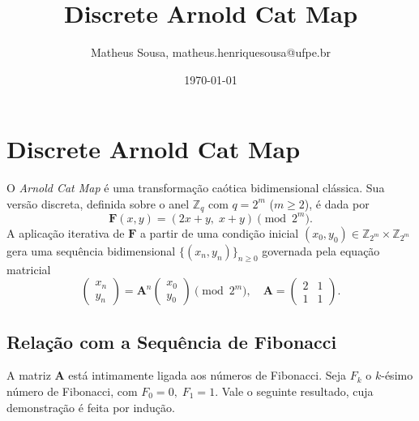 \documentclass[12pt,a4paper]{article}
\title{Discrete Arnold Cat Map}
\author{Matheus Sousa, matheus.henriquesousa@ufpe.br}
\date{\today}
\begin{document}
\maketitle

\section{Discrete Arnold Cat Map}
O \textit{Arnold Cat Map} é uma transformação caótica bidimensional clássica. Sua versão discreta, definida sobre o anel \(\mathbb{Z}_{q}\) com \(q=2^m\) (\(m\ge 2\)), é dada por
\begin{equation}\label{eq:dacm}
\mathbf{F}(x,y) = (2x + y,\; x + y) \pmod{2^m}.
\end{equation}
A aplicação iterativa de \(\mathbf{F}\) a partir de uma condição inicial \((x_0,y_0)\in \mathbb{Z}_{2^m}\times\mathbb{Z}_{2^m}\) gera uma sequência bidimensional \(\{(x_n,y_n)\}_{n\ge 0}\) governada pela equação matricial
\begin{equation}\label{eq:matriz}
\begin{pmatrix} x_n \\ y_n \end{pmatrix}
= \mathbf{A}^n \begin{pmatrix} x_0 \\ y_0 \end{pmatrix} \pmod{2^m},
\quad \mathbf{A} = \begin{pmatrix} 2 & 1 \\ 1 & 1 \end{pmatrix}.
\end{equation}

\subsection{Relação com a Sequência de Fibonacci}
A matriz \(\mathbf{A}\) está intimamente ligada aos números de Fibonacci. Seja \(F_k\) o \(k\)-ésimo número de Fibonacci, com \(F_0=0,\;F_1=1\). Vale o seguinte resultado, cuja demonstração é feita por indução.
\end{document}
